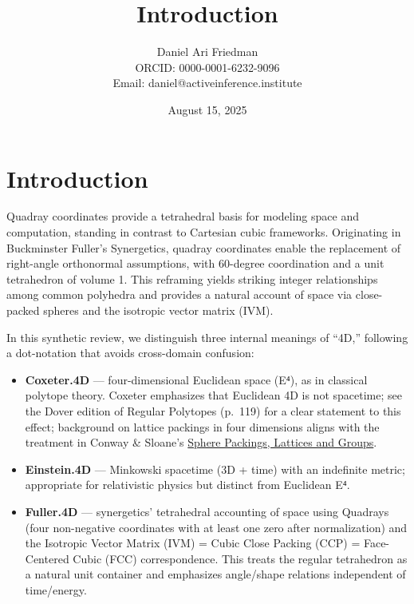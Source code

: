 \documentclass[
  10pt,
]{article}
\title{Introduction}
\author{Daniel Ari Friedman\\ ORCID: 0000-0001-6232-9096\\ Email: daniel@activeinference.institute}
\date{August 15, 2025}
\providecommand{\tightlist}{%
  \setlength{\itemsep}{0pt}\setlength{\parskip}{0pt}}
\begin{document}
\maketitle

{
\hypersetup{linkcolor=black}
\setcounter{tocdepth}{3}
\tableofcontents
}
\hypertarget{introduction}{%
\section{Introduction}\label{introduction}}

Quadray coordinates provide a tetrahedral basis for modeling space and
computation, standing in contrast to Cartesian cubic frameworks.
Originating in Buckminster Fuller's Synergetics, quadray coordinates
enable the replacement of right-angle orthonormal assumptions, with
60-degree coordination and a unit tetrahedron of volume 1. This
reframing yields striking integer relationships among common polyhedra
and provides a natural account of space via close-packed spheres and the
isotropic vector matrix (IVM).

In this synthetic review, we distinguish three internal meanings of
``4D,'' following a dot-notation that avoids cross-domain confusion:

\begin{itemize}
\tightlist
\item
  \textbf{Coxeter.4D} --- four-dimensional Euclidean space (E⁴), as in
  classical polytope theory. Coxeter emphasizes that Euclidean 4D is not
  spacetime; see the Dover edition of Regular Polytopes (p.~119) for a
  clear statement to this effect; background on lattice packings in four
  dimensions aligns with the treatment in Conway \& Sloane's
  \href{https://link.springer.com/book/10.1007/978-1-4757-6568-7}{Sphere
  Packings, Lattices and Groups}.
\item
  \textbf{Einstein.4D} --- Minkowski spacetime (3D + time) with an
  indefinite metric; appropriate for relativistic physics but distinct
  from Euclidean E⁴.
\item
  \textbf{Fuller.4D} --- synergetics' tetrahedral accounting of space
  using Quadrays (four non-negative coordinates with at least one zero
  after normalization) and the Isotropic Vector Matrix (IVM) = Cubic
  Close Packing (CCP) = Face-Centered Cubic (FCC) correspondence. This
  treats the regular tetrahedron as a natural unit container and
  emphasizes angle/shape relations independent of time/energy.
\end{itemize}
\end{document}
